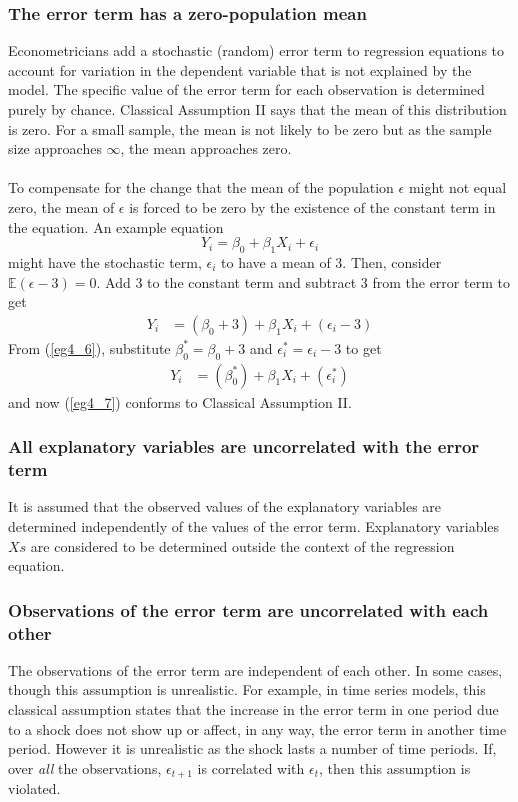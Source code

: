 \documentclass[11pt]{article}
\begin{document}
\subsubsection{The error term has a zero-population mean}
Econometricians add a stochastic (random) error term to regression equations to account for variation in the dependent variable that is not explained by the model. The specific value of the error term for each observation is determined purely by chance. Classical Assumption II says that the mean of this distribution is zero. For a small sample, the mean is not likely to be zero but as the sample size approaches $\infty$, the mean approaches zero.\\ \\
To compensate for the change that the mean of the population $\epsilon$ might not equal zero, the mean of $\epsilon$ is forced to be zero by the existence of the constant term in the equation. An example equation
\begin{equation}
Y_i = \beta_0+\beta_1X_i + \epsilon_i \label{eg4_5}
\end{equation}
might have the stochastic term, $\epsilon_i$ to have a mean of $3$. Then, consider $\mathbb{E}(\epsilon -3) = 0$. Add 3 to the constant term and subtract 3 from the error term to get
\begin{align}\label{eg4_6}
Y_i &= (\beta_0+3)+\beta_1X_i + (\epsilon_i -3)
\end{align}
From (\ref{eg4_6}), substitute $\beta_0^*=\beta_0+3$ and $\epsilon _i^* = \epsilon_i -3$ to get
\begin{align}
\label{eg4_7}
Y_i &= (\beta_0^*)+\beta_1X_i + (\epsilon_i^*)
\end{align}
and now (\ref{eg4_7}) conforms to Classical Assumption II.
\subsubsection{All explanatory variables are uncorrelated with the error term}
It is assumed that the observed values of the explanatory variables are determined independently of the values of the error term. Explanatory variables $Xs$ are considered to be determined outside the context of the regression equation.
\subsubsection{Observations of the error term are uncorrelated with each other}
The observations of the error term are independent of each other. In some cases, though this assumption is unrealistic. For example, in time series models, this classical assumption states that the increase in the error term in one period due to a shock does not show up or affect, in any way, the error term in another time period. However it is unrealistic as the shock lasts a number of time periods. If, over \textit{all} the observations, $\epsilon_{t+1}$ is correlated with $\epsilon_t$, then this assumption is violated.
\end{document}
